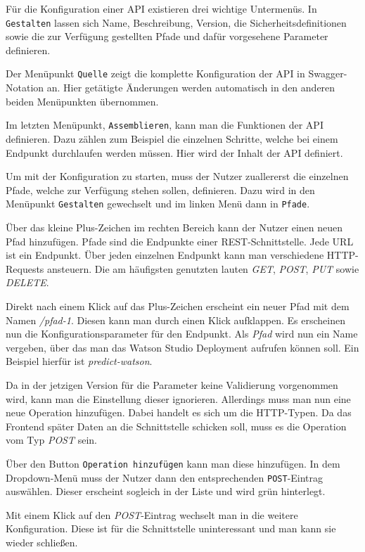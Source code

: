 Für die Konfiguration einer API existieren drei wichtige Untermenüs. In \texttt{Gestalten} lassen sich Name, Beschreibung,
Version, die Sicherheitsdefinitionen sowie die zur Verfügung gestellten Pfade und dafür vorgesehene Parameter definieren.

Der Menüpunkt \texttt{Quelle} zeigt die komplette Konfiguration der API in Swagger-Notation an. Hier getätigte Änderungen
werden automatisch in den anderen beiden Menüpunkten übernommen.

Im letzten Menüpunkt, \texttt{Assemblieren}, kann man die Funktionen der API definieren. Dazu zählen zum Beispiel die
einzelnen Schritte, welche bei einem Endpunkt durchlaufen werden müssen. Hier wird der Inhalt der API definiert.

Um mit der Konfiguration zu starten, muss der Nutzer zuallererst die einzelnen Pfade, welche zur Verfügung stehen
sollen, definieren. Dazu wird in den Menüpunkt \texttt{Gestalten} gewechselt und im linken Menü dann in \texttt{Pfade}.

Über das kleine Plus-Zeichen im rechten Bereich kann der Nutzer einen neuen Pfad hinzufügen. Pfade sind die Endpunkte
einer REST-Schnittstelle. Jede URL ist ein Endpunkt. Über jeden einzelnen Endpunkt kann man verschiedene HTTP-Requests
ansteuern. Die am häufigsten genutzten lauten \textit{GET}, \textit{POST}, \textit{PUT} sowie \textit{DELETE}.

Direkt nach einem Klick auf das Plus-Zeichen erscheint ein neuer Pfad mit dem Namen \textit{/pfad-1}. Diesen kann man
durch einen Klick aufklappen. Es erscheinen nun die Konfigurationsparameter für den Endpunkt. Als \textit{Pfad} wird nun
ein Name vergeben, über das man das Watson Studio Deployment aufrufen können soll. Ein Beispiel hierfür ist
\textit{predict-watson}.

Da in der jetzigen Version für die Parameter keine Validierung vorgenommen wird, kann man die Einstellung dieser
ignorieren. Allerdings muss man nun eine neue Operation hinzufügen. Dabei handelt es sich um die HTTP-Typen. Da das
Frontend später Daten an die Schnittstelle schicken soll, muss es die Operation vom Typ \textit{POST} sein.

Über den Button \texttt{Operation hinzufügen} kann man diese hinzufügen. In dem Dropdown-Menü muss der Nutzer dann den
entsprechenden \texttt{POST}-Eintrag auswählen. Dieser erscheint sogleich in der Liste und wird grün hinterlegt.

Mit einem Klick auf den \textit{POST}-Eintrag wechselt man in die weitere Konfiguration. Diese ist für die Schnittstelle
uninteressant und man kann sie wieder schließen.

